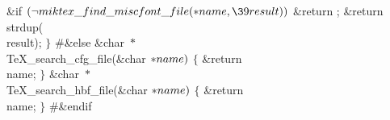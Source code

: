 \&{if} ${}(\R\\{miktex\_find\_miscfont\_file}({*}\\{name},\39\\{result})){}$\1\5
\&{return} ;\2\6
\&{return} \\{strdup}(\\{result});\6
\4${}\}{}$\2\7
\8\#\&{else}\7
\&{char} ${}{*}{}$\\{TeX\_search\_cfg\_file}(\&{char} ${}{*}\\{name}){}$\1\1\2%
\2\6
${}\{{}$\1\6
\&{return} \\{name};\6
\4${}\}{}$\2\7
\&{char} ${}{*}{}$\\{TeX\_search\_hbf\_file}(\&{char} ${}{*}\\{name}){}$\1\1\2%
\2\6
${}\{{}$\1\6
\&{return} \\{name};\6
\4${}\}{}$\2\6
\8\#\&{endif}\par
\fi


